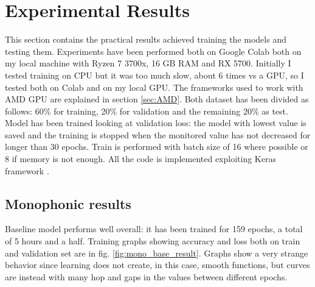 \documentclass{article}
\begin{document}

\section{Experimental Results}
\label{sec:results}

This section contains the practical results achieved training the models and testing them. Experiments have been performed both on Google Colab \cite{colab} both on my local machine with Ryzen 7 3700x, 16 GB RAM and RX 5700. Initially I tested training on CPU but it was too much slow, about 6 times vs a GPU, so I tested both on Colab and on my local GPU. The frameworks used to work with AMD GPU are explained in section \ref{sec:AMD}.\newline
Both dataset has been divided as follows: 60\% for training, 20\% for validation and the remaining 20\% as test. Model has been trained looking at validation loss: the model with lowest value is saved and the training is stopped when the monitored value has not decreased for longer than 30 epochs. Train is performed with batch size of 16 where possible or 8 if memory is not enough. All the code is implemented exploiting Keras framework \cite{keras}.

\subsection{Monophonic results}
\label{subsec:mono_results}

Baseline model performs well overall: it has been trained for 159 epochs, a total of 5 hours and a half. Training graphs showing accuracy and loss both on train and validation set are in fig. \ref{fig:mono_base_result}. Graphs show a very strange behavior since learning does not create, in this case, smooth functions, but curves are instead with many hop and gaps in the values between different epochs. 
\end{document}
